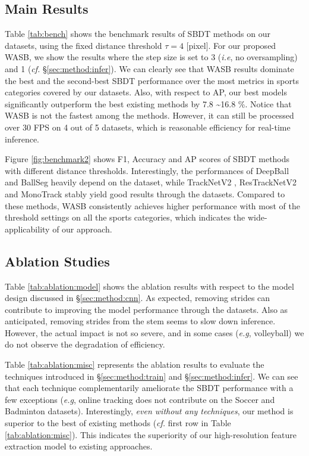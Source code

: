 \documentclass{bmvc2k}
\def\eg{\emph{e.g}\bmvaOneDot}
\def\ie{\emph{i.e}\bmvaOneDot}
\begin{document}
\subsection{Main Results}
\label{sec:eval:comp}
Table \ref{tab:bench} shows the benchmark results of SBDT methods on our datasets, using the fixed distance threshold $\tau=4$ [pixel].
For our proposed WASB, we show the results where the step size is set to 3 (\ie, no oversampling) and 1 ({\it cf.} \S \ref{sec:method:infer}).
We can clearly see that WASB results dominate the best and the second-best SBDT performance over the most metrics in sports categories covered by our datasets.
Also, with respect to AP, our best models significantly outperform the best existing methods by 7.8 \textasciitilde 16.8 \%.
Notice that WASB is not the fastest among the methods.
However, it can still be processed over 30 FPS on 4 out of 5 datasets, which is reasonable efficiency for real-time inference.
\par
Figure \ref{fig:benchmark2} shows F1, Accuracy and AP scores of SBDT methods with different distance thresholds.
Interestingly, the performances of DeepBall \cite{komorowski+2019mva,komorowski+2020visapp} and BallSeg \cite{zandycke+2019mmsports} heavily depend on the dataset,
while TrackNetV2 \cite{sun+2020icpai}, ResTrackNetV2 and MonoTrack \cite{liu+2022cvprw} stably yield good results through the datasets.
Compared to these methods, WASB consistently achieves higher performance with most of the threshold settings on all the sports categories, which indicates the wide-applicability of our approach.
\subsection{Ablation Studies}
\label{sec:eval:ablation}
Table \ref{tab:ablation:model} shows the ablation results with respect to the model design discussed in \S \ref{sec:method:cnn}.
As expected, removing strides can contribute to improving the model performance through the datasets.
Also as anticipated, removing strides from the stem seems to slow down inference.
However, the actual impact is not so severe, and in some cases (\eg, volleyball) we do not observe the degradation of efficiency.
\par
Table \ref{tab:ablation:misc} represents the ablation results to evaluate the techniques introduced in \S \ref{sec:method:train} and \S \ref{sec:method:infer}.
We can see that each technique complementarily ameliorate the SBDT performance with a few exceptions (\eg, online tracking does not contribute on the Soccer and Badminton datasets).
Interestingly, {\it even without any techniques}, our method is superior to the best of existing methods ({\it cf.} first row in Table \ref{tab:ablation:misc}).
This indicates the superiority of our high-resolution feature extraction model to existing approaches.
\end{document}
